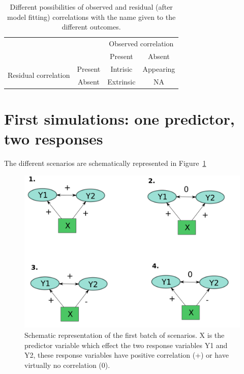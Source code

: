 \documentclass[a4paper,10pt]{article}
\begin{document}
\begin{table}[h!]
 \caption{Different possibilities of observed and residual (after model fitting) correlations with the name given to the different outcomes.}
 \vspace*{0.5cm}
 \label{tab:cat}
 \begin{tabular}{lc|cc|}
  & & \multicolumn{2}{|c|}{Observed correlation} \\
  & & Present & Absent \\ \hline
  \multirow{2}{*}{Residual correlation} & Present & Intrisic & Appearing \\
  & Absent & Extrinsic & NA \\
 \end{tabular}

\end{table}



\section{First simulations: one predictor, two responses}

The different scenarios are schematically represented in Figure~\ref{fig:schema1}

\begin{figure}[h!]
 \caption{Schematic representation of the first batch of scenarios. X is the predictor variable which effect the two response variables Y1 and Y2, these response variables have positive correlation (+) or have virtually no correlation (0). }
 \label{fig:schema1}
 \includegraphics[width=\textwidth,keepaspectratio]{simulation1_4.png}
\end{figure}
\end{document}
